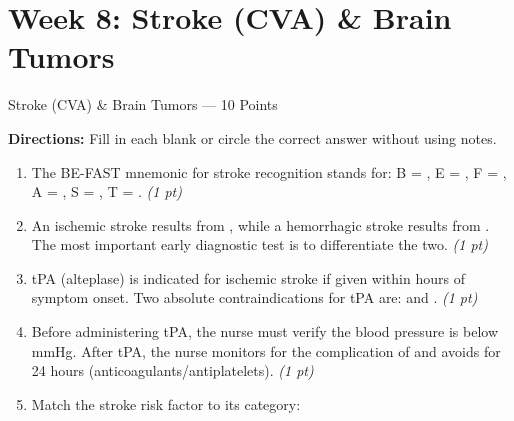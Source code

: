 \documentclass[11pt,letterpaper]{article}
\newcommand{\blank}[1][3cm]{\underline{\hspace{#1}}}
\begin{document}
\newpage


\section{Week 8: Stroke (CVA) \& Brain Tumors}

\begin{diagbox}{Stroke (CVA) \& Brain Tumors --- 10 Points}

\textbf{Directions:} Fill in each blank or circle the correct answer without using notes.

\begin{enumerate}[leftmargin=1.5em, label=\textbf{\arabic*.},start=71]

  \item The BE-FAST mnemonic for stroke recognition stands for:
        B = \blank[3cm], E = \blank[3cm], F = \blank[3cm],
        A = \blank[3cm], S = \blank[3cm], T = \blank[3cm].
        \hfill\textit{(1 pt)}

  \item An ischemic stroke results from \blank[4cm], while a hemorrhagic
        stroke results from \blank[4cm].  The most important early
        diagnostic test is \blank[3cm] to differentiate the two.
        \hfill\textit{(1 pt)}

  \item tPA (alteplase) is indicated for ischemic stroke if given within
        \blank[2cm] hours of symptom onset.  Two absolute contraindications
        for tPA are: \blank[4cm] and \blank[4cm].
        \hfill\textit{(1 pt)}

  \item Before administering tPA, the nurse must verify the blood pressure is
        below \blank[3cm] mmHg.  After tPA, the nurse monitors for the
        complication of \blank[4cm] and avoids \blank[3cm]
        for 24 hours (anticoagulants/antiplatelets).
        \hfill\textit{(1 pt)}

  \item Match the stroke risk factor to its category:


\end{enumerate}
\end{diagbox}
\end{document}
